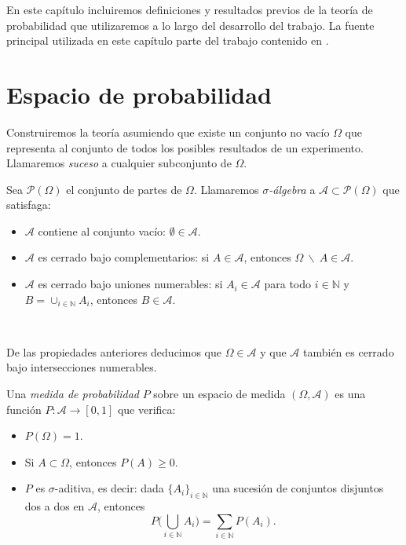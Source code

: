 \documentclass[oneside,openright,titlepage,numbers=noenddot,openany,headinclude,footinclude=true,
cleardoublepage=empty,abstractoff,BCOR=5mm,paper=a4,fontsize=12pt,main=spanish]{scrreprt}
\begin{document}
En este capítulo incluiremos definiciones y resultados previos de la teoría de probabilidad que utilizaremos a lo largo del desarrollo del trabajo. La fuente principal utilizada en este capítulo parte del trabajo contenido en \cite{probability2014}.

\section{Espacio de probabilidad}

Construiremos la teoría asumiendo que existe un conjunto no vacío $\Omega$ que representa al conjunto de todos los posibles resultados de un experimento. Llamaremos \textit{suceso} a cualquier subconjunto de $\Omega$.\\

\begin{definition}
Sea $\mathcal{P}(\Omega)$ el conjunto de partes de $\Omega$. Llamaremos \textit{$\sigma$-álgebra} a $\mathcal{A} \subset \mathcal{P}(\Omega)$ que satisfaga:

\begin{itemize}
\item $\mathcal{A}$ contiene al conjunto vacío: $\emptyset \in \mathcal{A}$.
\item $\mathcal{A}$ es cerrado bajo complementarios: si $A \in \mathcal{A}$, entonces $\Omega\ \backslash\ A \in \mathcal{A}$.
\item $\mathcal{A}$ es cerrado bajo uniones numerables: si $A_i \in \mathcal{A}$ para todo $i \in \mathbb{N}$ y $B=\cup_{i\in \mathbb{N}}A_i$, entonces $B \in \mathcal{A}$.
\end{itemize}
\end{definition}\

De las propiedades anteriores deducimos que $\Omega \in \mathcal{A}$ y que $\mathcal{A}$ también es cerrado bajo intersecciones numerables.\\

\begin{definition} Una \textit{medida de probabilidad} $P$ sobre un espacio de medida $(\Omega, \mathcal{A})$ es una función $P\colon \mathcal{A} \to [0,1]$ que verifica:

\begin{itemize}
    \item $P(\Omega) = 1$.
    \item Si $A \subset \Omega$, entonces $P(A) \geq 0$.
    \item $P$ es $\sigma$-aditiva, es decir: dada $\{A_i\}_{i\in \mathbb{N}}$ una sucesión de conjuntos disjuntos dos a dos en $\mathcal{A}$, entonces
  \[
  P\Big(\bigcup_{i\in \mathbb{N}}A_i \Big) = \sum_{i \in \mathbb{N}}P(A_i).
  \]
\end{itemize}
\end{definition}\
\end{document}

